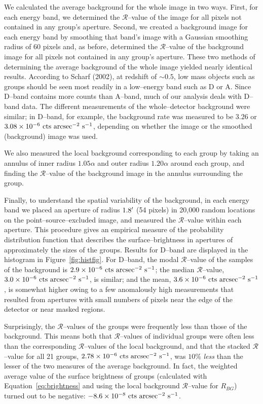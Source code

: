\documentclass[12pt,preprint]{aastex}
\newcommand{\R}[0]{\mathcal{R}}
\begin{document}
We calculated the average background for the whole image in two ways. 
First, for each energy band, we determined the $\R$--value of the image
for all pixels not contained in any group's aperture.
Second, we created
a background image for each energy band by smoothing that band's image
with a Gaussian smoothing radius of 60 pixels and, as before, determined
the $\R$--value of the background image for all pixels not contained in any
group's aperture.  These two methods of determining the average
background of the whole image 
yielded nearly identical results.  According to
Scharf (2002), at redshift of $\sim 0.5$,
low mass objects such as groups should be seen most readily in a
low--energy band such as D or A. 
Since D--band contains more counts than A--band, much of our analysis
deals with D--band data.  The different measurements of the whole--detector
background were similar; in D--band, for example, the background
rate was measured to be $3.26$ or
$3.08\times 10^{-6}{\rm~cts~arcsec^{-2}~s^{-1}}$, depending on 
whether the image or the smoothed (background) image was used.

We also measured the local background corresponding to each group by
taking an annulus of inner radius $1.05\alpha$ and outer radius
$1.20\alpha$ around each group, and finding the $\R$--value of the
background image in the annulus surrounding the group.

Finally, to understand the spatial variability of the background, in each
energy band we placed an aperture of radius $1.8\mbox{$^\prime$}$ (54 pixels) in
20,000 random locations on the point--source--excluded image, and
measured the $\R$--value within each aperture.  This procedure gives an
empirical measure of the probability distribution function
that describes the
surface--brightness in apertures of approximately the sizes of the groups. 
Results for D--band are displayed in the histogram in
Figure~\ref{fig:histfig}.  For D--band, the modal $\R$--value of the samples
of the background is $2.9\times10^{-6}{\rm~cts~arcsec^{-2}~s^{-1}}$;
the median $\R$--value, $3.0\times10^{-6}{\rm~cts~arcsec^{-2}~s^{-1}}$,
is similar; and the mean,
$3.6\times10^{-6}{\rm~cts~arcsec^{-2}~s^{-1}}$, is somewhat higher 
owing to a few anomalously high measurements that resulted from apertures
with small numbers 
of pixels near the edge of the detector or near masked regions. 

Surprisingly, the $\R$--values of the groups were frequently less than
those of the background.  This means both that $\R$--values of individual groups
were often less than the corresponding $\R$--values of the local background, and
that the stacked $\R$--value for all 21 groups,
$2.78\times 10^{-6}{\rm~cts~arcsec^{-2}~s^{-1}}$, was $10\%$ {\it less} than
the lesser of the two measures of the average background.  In fact, the weighted
average value of the surface brightness of groups (calculated with 
Equation~\ref{eq:brightness} and using the local background $\R$--value for
$R_{BG}$) turned out to be negative:
$-8.6\times 10^{-8}{\rm~cts~arcsec^{-2}~s^{-1}}$.
\end{document}
